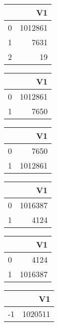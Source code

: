 \bigskip\bigskip
\centering
\begin{tabular}{rr}
  \hline
 & V1 \\ 
  \hline
0 & 1012861 \\ 
  1 & 7631 \\ 
  2 &  19 \\ 
   \hline
\end{tabular}

\bigskip\bigskip
\centering
\begin{tabular}{rr}
  \hline
 & V1 \\ 
  \hline
0 & 1012861 \\ 
  1 & 7650 \\ 
   \hline
\end{tabular}

\bigskip\bigskip
\centering
\begin{tabular}{rr}
  \hline
 & V1 \\ 
  \hline
0 & 7650 \\ 
  1 & 1012861 \\ 
   \hline
\end{tabular}

\bigskip\bigskip
\centering
\begin{tabular}{rr}
  \hline
 & V1 \\ 
  \hline
0 & 1016387 \\ 
  1 & 4124 \\ 
   \hline
\end{tabular}

\bigskip\bigskip
\centering
\begin{tabular}{rr}
  \hline
 & V1 \\ 
  \hline
0 & 4124 \\ 
  1 & 1016387 \\ 
   \hline
\end{tabular}

\bigskip\bigskip
\centering
\begin{tabular}{rr}
  \hline
 & V1 \\ 
  \hline
-1 & 1020511 \\ 
   \hline
\end{tabular}

